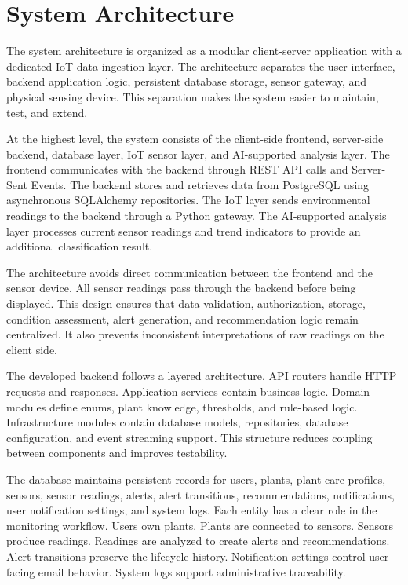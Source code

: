 \section{System Architecture}
\label{sec:system-architecture}

The system architecture is organized as a modular client-server application with a dedicated IoT data ingestion layer. The architecture separates the user interface, backend application logic, persistent database storage, sensor gateway, and physical sensing device. This separation makes the system easier to maintain, test, and extend.

At the highest level, the system consists of the client-side frontend, server-side backend, database layer, IoT sensor layer, and AI-supported analysis layer. The frontend communicates with the backend through REST API calls and Server-Sent Events. The backend stores and retrieves data from PostgreSQL using asynchronous SQLAlchemy repositories. The IoT layer sends environmental readings to the backend through a Python gateway. The AI-supported analysis layer processes current sensor readings and trend indicators to provide an additional classification result.

The architecture avoids direct communication between the frontend and the sensor device. All sensor readings pass through the backend before being displayed. This design ensures that data validation, authorization, storage, condition assessment, alert generation, and recommendation logic remain centralized. It also prevents inconsistent interpretations of raw readings on the client side.

The developed backend follows a layered architecture. API routers handle HTTP requests and responses. Application services contain business logic. Domain modules define enums, plant knowledge, thresholds, and rule-based logic. Infrastructure modules contain database models, repositories, database configuration, and event streaming support. This structure reduces coupling between components and improves testability.

The database maintains persistent records for users, plants, plant care profiles, sensors, sensor readings, alerts, alert transitions, recommendations, notifications, user notification settings, and system logs. Each entity has a clear role in the monitoring workflow. Users own plants. Plants are connected to sensors. Sensors produce readings. Readings are analyzed to create alerts and recommendations. Alert transitions preserve the lifecycle history. Notification settings control user-facing email behavior. System logs support administrative traceability.

